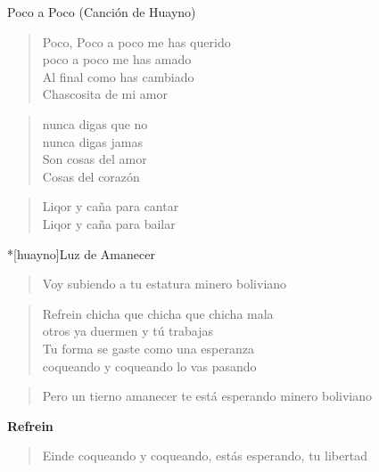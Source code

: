 \begin{song}[huayno]{Poco a Poco (Canción de Huayno)}
\begin{verse}{}
Poco, Poco a poco me has querido\\
poco a poco me has amado\\
Al final como has cambiado\\
Chascosita de mi amor
\end{verse}

\begin{verse}{}
nunca digas que no\\
nunca digas jamas\\
Son cosas del amor\\
Cosas del corazón
\end{verse}

\begin{verse}{}
Liqor y caña para cantar\\
Liqor y caña para bailar
\end{verse}
\end{song}

\begin{song}*[huayno]{Luz de Amanecer}
\begin{verse}{}
Voy subiendo a tu estatura minero boliviano
\end{verse}

\begin{verse}{Refrein}
chicha que chicha que chicha mala\\
otros ya duermen y tú trabajas\\
Tu forma se gaste como una esperanza\\
coqueando y coqueando lo vas pasando
\end{verse}

\begin{verse}{}
Pero un tierno amanecer te está esperando minero boliviano
\end{verse}

\textbf{Refrein}

\begin{verse}{Einde}
coqueando y coqueando, estás esperando, tu libertad
\end{verse}
\end{song}
